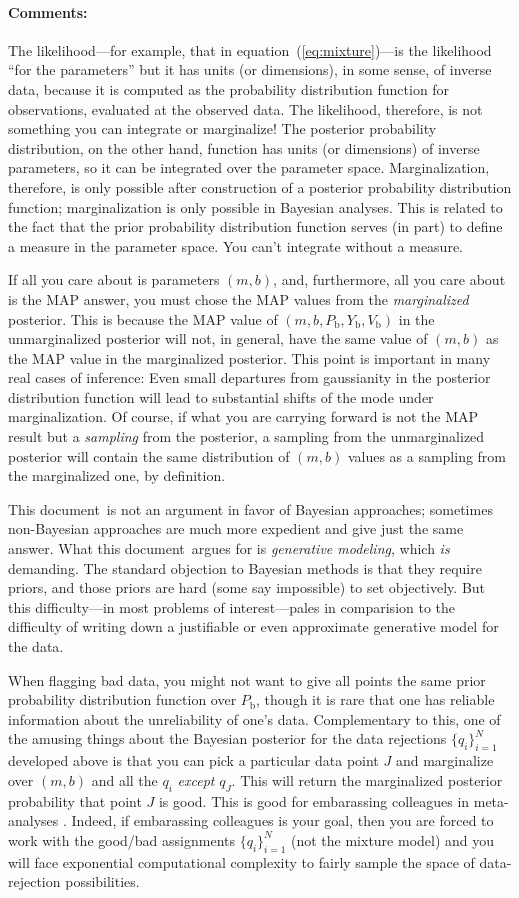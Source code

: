 \documentclass[12pt,twoside]{article}
\newcommand{\documentname}{document}
\newcommand{\commentsname}{Comments}
\newcounter{problem}
\newenvironment{comments}{\paragraph{\commentsname:}}{}
\newcommand{\setofall}[3]{\{{#1}\}_{{#2}}^{{#3}}}
\newcommand{\allq}{\setofall{q_i}{i=1}{N}}
\newcommand{\Pbad}{P_{\mathrm{b}}}
\newcommand{\Ybad}{Y_{\mathrm{b}}}
\newcommand{\Vbad}{V_{\mathrm{b}}}
\begin{document}
\begin{comments}
The likelihood---for example, that in equation~(\ref{eq:mixture})---is
the likelihood ``for the parameters'' but it has units (or
dimensions), in some sense, of inverse data, because it is computed as
the probability distribution function for observations, evaluated at
the observed data.  The likelihood, therefore, is not something you
can integrate or marginalize!  The posterior probability distribution,
on the other hand, function has units (or dimensions) of inverse
parameters, so it can be integrated over the parameter space.
Marginalization, therefore, is only possible after construction of a
posterior probability distribution function; marginalization is only
possible in Bayesian analyses.  This is related to the fact that the
prior probability distribution function serves (in part) to define a
measure in the parameter space.  You can't integrate without a
measure.

If all you care about is parameters $(m,b)$, and, furthermore, all you
care about is the MAP answer, you must chose the MAP values from the
\emph{marginalized} posterior.  This is because the MAP value of
$(m,b,\Pbad,\Ybad,\Vbad)$ in the unmarginalized posterior will not, in
general, have the same value of $(m,b)$ as the MAP value in the
marginalized posterior.  This point is important in many real cases of
inference: Even small departures from gaussianity in the posterior
distribution function will lead to substantial shifts of the mode
under marginalization.  Of course, if what you are carrying forward is
not the MAP result but a \emph{sampling} from the posterior, a
sampling from the unmarginalized posterior will contain the same
distribution of $(m,b)$ values as a sampling from the marginalized
one, by definition.

This \documentname\ is not an argument in favor of Bayesian
approaches; sometimes non-Bayesian approaches are much more expedient
and give just the same answer.  What this \documentname\ argues for is
\emph{generative modeling}, which \emph{is} demanding.  The standard
objection to Bayesian methods is that they require priors, and those
priors are hard (some say impossible) to set objectively.  But this
difficulty---in most problems of interest---pales in comparision to
the difficulty of writing down a justifiable or even approximate
generative model for the data.

When flagging bad data, you might not want to give all points the same
prior probability distribution function over $\Pbad$, though it is
rare that one has reliable information about the unreliability of
one's data.  Complementary to this, one of the amusing things about
the Bayesian posterior for the data rejections $\allq$ developed above
is that you can pick a particular data point $J$ and marginalize over
$(m,b)$ and all the $q_i$ \emph{except} $q_J$.  This will return the
marginalized posterior probability that point $J$ is good.  This is
good for embarassing colleagues in meta-analyses \citep{pressH0}.
Indeed, if embarassing colleagues is your goal, then you are forced to
work with the good/bad assignments $\allq$ (not the mixture model) and
you will face exponential computational complexity to fairly sample
the space of data-rejection possibilities.


\end{comments}
\end{document}
